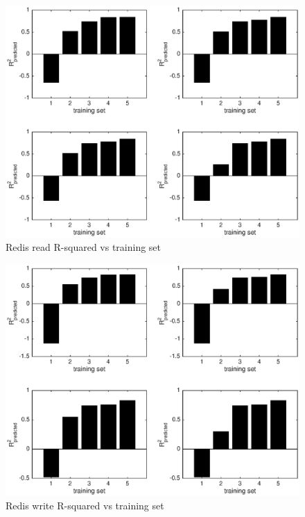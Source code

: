 \documentclass{acm_proc_article-sp}
\begin{document}
  \begin{figure}
    \centering
    \includegraphics[scale = 0.5]{bar_read_avg_latency.eps}
    \caption{Redis read R-squared vs training set}
    \label{figure:redisbarread}
  \end{figure}

  \begin{figure}
    \centering
    \includegraphics[scale = 0.5]{bar_write_avg_latency.eps}
    \caption{Redis write R-squared vs training set}
    \label{figure:redisbarread}
  \end{figure}
\end{document}

